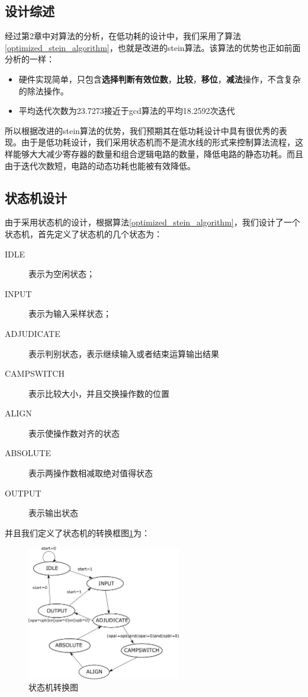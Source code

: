 \documentclass[12pt]{article}
\begin{document}
\subsection{设计综述}
经过第2章中对算法的分析，在低功耗的设计中，我们采用了算法\ref{optimized_stein_algorithm}，也就是改进的stein算法。该算法的优势也正如前面分析的一样：
\begin{itemize}
\item 硬件实现简单，只包含\textbf{选择判断有效位数}，\textbf{比较}，\textbf{移位}，\textbf{减法}操作，不含复杂的除法操作。
\item 平均迭代次数为23.7273接近于gcd算法的平均18.2592次迭代
\end{itemize}

所以根据改进的stein算法的优势，我们预期其在低功耗设计中具有很优秀的表现。由于是低功耗设计，我们采用状态机而不是流水线的形式来控制算法流程，这样能够大大减少寄存器的数量和组合逻辑电路的数量，降低电路的静态功耗。而且由于迭代次数短，电路的动态功耗也能被有效降低。

\subsection{状态机设计}
由于采用状态机的设计，根据算法\ref{optimized_stein_algorithm}，我们设计了一个状态机，首先定义了状态机的几个状态为：

\begin{description}
\item[IDLE] 表示为空闲状态；
\item[INPUT] 表示为输入采样状态；
\item[ADJUDICATE] 表示判别状态，表示继续输入或者结束运算输出结果
\item[CAMPSWITCH] 表示比较大小，并且交换操作数的位置
\item[ALIGN] 表示使操作数对齐的状态
\item[ABSOLUTE] 表示两操作数相减取绝对值得状态
\item[OUTPUT] 表示输出状态
\end{description}

并且我们定义了状态机的转换框图\ref{statemachine}为：

\begin{figure}[H]
\begin{center}
\includegraphics[width=0.6\textwidth]{./lowpowerdesign/low_power_desing_statemachine.eps}
\caption{状态机转换图}
\label{statemachine}
\end{center}
\end{figure}
\end{document}
